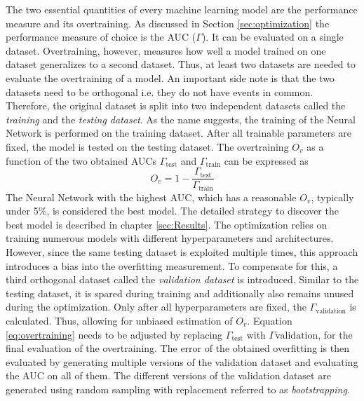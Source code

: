 The two essential quantities of every machine learning model are the performance measure and its overtraining. As discussed in Section \ref{sec:optimization} the performance measure of choice is the AUC ($\Gamma$). It can be evaluated on a single dataset. Overtraining, however, measures how well a model trained on one dataset generalizes to a second dataset. Thus, at least two datasets are needed to evaluate the overtraining of a model. An important side note is that the two datasets need to be orthogonal i.e. they do not have events in common. Therefore, the original dataset is split into two independent datasets called the \textit{training} and the \textit{testing dataset}. As the name suggests, the training of the Neural Network is performed on the training dataset. After all trainable parameters are fixed, the model is tested on the testing dataset. The overtraining $O_v$ as a function of the two obtained AUCs $\Gamma_{\text{test}}$ and $\Gamma_{\text{train}}$ can be expressed as
\begin{equation}
O_v = 1 - \frac{\Gamma_{\text{test}}}{\Gamma_\text{train}}
\label{eq:overtraining}
\end{equation}
The Neural Network with the highest AUC, which has a reasonable $O_v$, typically under 5\%, is considered the best model. The detailed strategy to discover the best model is described in chapter \ref{sec:Results}. The optimization relies on training numerous models with different hyperparameters and architectures. However, since the same testing dataset is exploited multiple times, this approach introduces a bias into the overfitting measurement. To compensate for this, a third orthogonal dataset called the \textit{validation dataset} is introduced. Similar to the testing dataset, it is spared during training and additionally also remains unused during the optimization. Only after all hyperparameters are fixed, the $\Gamma_{\text{validation}}$ is calculated. Thus, allowing for unbiased estimation of $O_v$. Equation \ref{eq:overtraining} needs to be adjusted by replacing $\Gamma_{\text{test}}$ with $\Gamma{\text{validation}}$, for the final evaluation of the overtraining. The error of the obtained overfitting is then evaluated by generating multiple versions of the validation dataset and evaluating the AUC on all of them. The different versions of the validation dataset are generated using random sampling with replacement referred to as \textit{bootstrapping}. \\
